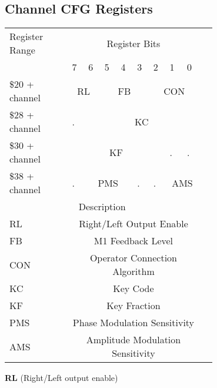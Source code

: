 \vspace{16pt}


\clearpage

\subsection{Channel CFG Registers}

\begin{tabular}{|m{0.25\linewidth}|p{0.05\linewidth}|p{0.05\linewidth}|p{0.05\linewidth}|p{0.05\linewidth}|p{0.05\linewidth}|p{0.05\linewidth}|p{0.05\linewidth}|p{0.05\linewidth}|p{0.05\linewidth}|}
	\hline

	\multirowcell{2}{Register\\Range}&\multicolumn{8}{c|}{Register Bits} \\\cline{2-9}
	& 7 & 6 & 5 & 4 & 3 & 2 & 1 & 0 \\ \hline

	\$20 + channel & \multicolumn{2}{c|}{RL} & \multicolumn{3}{c|}{FB} & \multicolumn{3}{c|}{CON} \\\cline{1-9}

	\$28 + channel & . & \multicolumn{7}{c|}{KC} \\\cline{1-9}
	\$30 + channel & \multicolumn{6}{c|}{KF} & . & . \\\cline{1-9}
	\$38 + channel & . & \multicolumn{3}{c|}{PMS} & . & . & \multicolumn{2}{c|}{AMS} \\\cline{1-9}

	\multicolumn{9}{|c|}{Description} \\ \hline
	
	RL & \multicolumn{8}{c|}{Right/Left Output Enable}\\\hline
	FB &  \multicolumn{8}{c|}{M1 Feedback Level}\\\hline
	CON &  \multicolumn{8}{c|}{Operator Connection Algorithm}\\\hline
	KC & \multicolumn{8}{c|}{Key Code}\\\hline
	KF & \multicolumn{8}{c|}{Key Fraction}\\\hline
	PMS & \multicolumn{8}{c|}{Phase Modulation Sensitivity}\\\hline
	AMS & \multicolumn{8}{c|}{Amplitude Modulation Sensitivity}\\\hline

\end{tabular}

\vspace{16pt}

{\bfseries RL} (Right/Left output enable)

